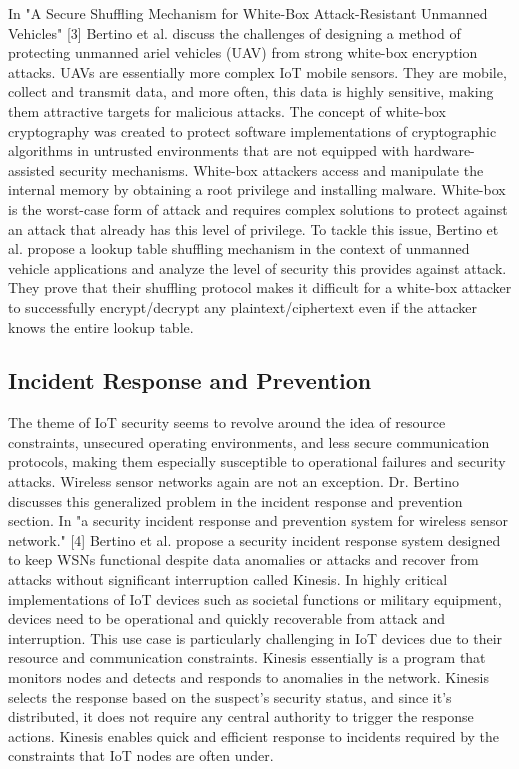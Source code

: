 \documentclass[journal,onecolumn]{IEEEtran}
\begin{document}
In "A Secure Shuffling Mechanism for White-Box Attack-Resistant Unmanned Vehicles" [3] Bertino et al. discuss the challenges of designing a method of protecting unmanned ariel vehicles (UAV) from strong white-box encryption attacks. UAVs are essentially more complex IoT mobile sensors. They are mobile, collect and transmit data, and more often, this data is highly sensitive, making them attractive targets for malicious attacks. The concept of white-box cryptography was created to protect software implementations of cryptographic algorithms in untrusted environments that are not equipped with hardware-assisted security mechanisms. White-box attackers access and manipulate the internal memory by obtaining a root privilege and installing malware. White-box is the worst-case form of attack and requires complex solutions to protect against an attack that already has this level of privilege. To tackle this issue, Bertino et al. propose a lookup table shuffling mechanism in the context of unmanned vehicle applications and analyze the level of security this provides against attack. They prove that their shuffling protocol makes it difficult for a white-box attacker to successfully encrypt/decrypt any plaintext/ciphertext even if the attacker knows the entire lookup table.

\subsection{Incident Response and Prevention}

The theme of IoT security seems to revolve around the idea of resource constraints, unsecured operating environments, and less secure communication protocols, making them especially susceptible to operational failures and security attacks. Wireless sensor networks again are not an exception. Dr. Bertino discusses this generalized problem in the incident response and prevention section. In "a security incident response and prevention system for wireless sensor network." [4] Bertino et al. propose a security incident response system designed to keep WSNs functional despite data anomalies or attacks and recover from attacks without significant interruption called Kinesis. In highly critical implementations of IoT devices such as societal functions or military equipment, devices need to be operational and quickly recoverable from attack and interruption. This use case is particularly challenging in IoT devices due to their resource and communication constraints. Kinesis essentially is a program that monitors nodes and detects and responds to anomalies in the network. Kinesis selects the response based on the suspect's security status, and since it's distributed, it does not require any central authority to trigger the response actions. Kinesis enables quick and efficient response to incidents required by the constraints that IoT nodes are often under. 
\end{document}
